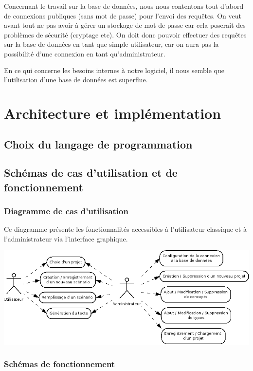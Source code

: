 \documentclass[12pt]{report}
\begin{document}
Concernant le travail sur la base de données, nous nous contentons tout
d'abord de connexions publiques (sans mot de passe) pour l'envoi des
requêtes. On veut avant tout ne pas avoir à gérer un stockage de mot de
passe car cela poserait des problèmes de sécurité (cryptage etc).
On doit donc pouvoir effectuer des requêtes sur la base de données en
tant que simple utilisateur, car on aura pas la possibilité d'une
connexion en tant qu'administrateur.

En ce qui concerne les besoins internes à notre logiciel, il nous semble
que l'utilisation d'une base de données est superflue.  


\chapter{Architecture et implémentation}

\section{Choix du langage de programmation}

\section{Schémas de cas d'utilisation et de fonctionnement}


\subsection{Diagramme de cas d'utilisation}

	Ce diagramme présente les fonctionnalités accessibles à l'utilisateur classique et à l'administrateur via l'interface graphique. \bigskip

	\includegraphics[scale=0.5]{cas_utilisation.png}

\subsection{Schémas de fonctionnement}
\end{document}
